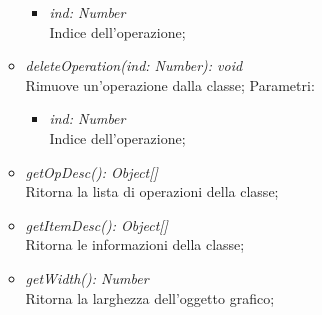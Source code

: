 \documentclass[../DefinizioneDiProdotto.tex]{subfiles}
\begin{document}
\begin{itemize}
\begin{itemize}
\begin{itemize}
						\item \emph{ind: Number} \\
						Indice dell'operazione;
					\end{itemize}
					\item \emph{deleteOperation(ind: Number): void}\\
					Rimuove un'operazione dalla classe;
					Parametri:
					\begin{itemize}
						\item \emph{ind: Number} \\
						Indice dell'operazione;
					\end{itemize}
					\item \emph{getOpDesc(): Object[]}\\
					Ritorna la lista di operazioni della classe;
					\item \emph{getItemDesc(): Object[]}\\
					Ritorna le informazioni della classe;		
					\item \emph{getWidth(): Number}\\
					Ritorna la larghezza dell'oggetto grafico;	
				\end{itemize}
			\end{itemize}
			
\end{document}

